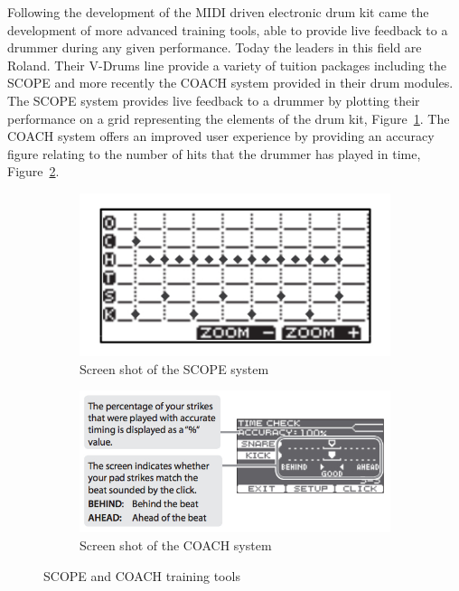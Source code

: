 \documentclass[a4paper, 11pt]{article}
\begin{document}
Following the development of the MIDI driven electronic drum kit came the development of more advanced training tools, able to provide live feedback to a drummer during any given performance. Today the leaders in this field are Roland. Their V-Drums line provide a variety of tuition packages including the SCOPE and more recently the COACH system provided in their drum modules. The SCOPE system provides live feedback to a drummer by plotting their performance on a grid representing the elements of the drum kit, Figure~\ref{fig: scope}. The COACH system offers an improved user experience by providing an accuracy figure relating to the number of hits that the drummer has played in time, Figure~\ref{fig: coach}.
\begin{figure}[ht]
\centering
\begin{subfigure}{.5\textwidth}
  \centering
  \includegraphics[width=0.5\linewidth]{images/Scope.jpg}
  \caption{Screen shot of the SCOPE system}
  \label{fig: scope}
\end{subfigure}%
\begin{subfigure}{.5\textwidth}
  \centering
  \includegraphics[width=0.75\linewidth]{images/coach.jpg}
  \caption{Screen shot of the COACH system}
  \label{fig: coach}
\end{subfigure}
\caption{SCOPE and COACH training tools}
\label{fig: systems}
\end{figure}

\end{document}
